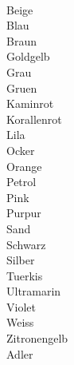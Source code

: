 \documentclass{article}
\begin{document}
\centering
\fontsize{120}{144} \selectfont
\phantom{ }\\
Beige
\newpage
\phantom{ }\\
Blau
\newpage
\phantom{ }\\

Braun
\newpage
\phantom{ }\\

Goldgelb
\newpage
\phantom{ }\\

Grau
\newpage
\phantom{ }\\

Gruen
\newpage
\phantom{ }\\

Kaminrot
\newpage
\phantom{ }\\

Korallenrot
\newpage
\phantom{ }\\

Lila
\newpage
\phantom{ }\\

Ocker
\newpage
\phantom{ }\\

Orange
\newpage
\phantom{ }\\

Petrol
\newpage
\phantom{ }\\

Pink
\newpage
\phantom{ }\\

Purpur
\newpage
\phantom{ }\\

Sand
\newpage
\phantom{ }\\

Schwarz
\newpage
\phantom{ }\\

Silber
\newpage
\phantom{ }\\

Tuerkis
\newpage
\phantom{ }\\

Ultramarin
\newpage
\phantom{ }\\

Violet
\newpage
\phantom{ }\\

Weiss
\newpage
\phantom{ }\\

Zitronengelb
\newpage
\phantom{ }\\

Adler
\newpage
\phantom{ }\\
\end{document}
